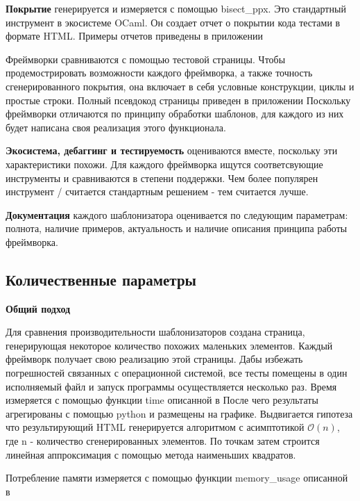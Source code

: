 \textbf{Покрытие} генерируется и измеряется с помощью bisect\_ppx.
Это стандартный инструмент в экосистеме OCaml.
Он создает отчет о покрытии кода тестами в формате HTML.
Примеры отчетов приведены в приложении %

Фреймворки сравниваются с помощью тестовой страницы.
Чтобы продемострировать возможности каждого фреймворка, а также точность сгенерированного покрытия, она включает в себя условные конструкции, циклы и простые строки.
Полный псевдокод страницы приведен в приложении %
Поскольку фреймворки отличаются по принципу обработки шаблонов, для каждого из них будет написана своя реализация этого функционала.

\textbf{Экосистема, дебаггинг и тестируемость} оцениваются вместе, поскольку эти характеристики похожи.
Для каждого фреймворка ищутся соответсвующие инструменты и сравниваются в степени поддержки.
Чем более популярен инструмент / считается стандартным решением - тем считается лучше.

\textbf{Документация} каждого шаблонизатора оценивается по следующим параметрам: полнота, наличие примеров, актуальность и наличие описания принципа работы фреймворка.


\subsection{Количественные параметры}

\textbf{Общий подход}

Для сравнения производительности шаблонизаторов создана страница, генерирующая некоторое количество похожих маленьких элементов.
Каждый фреймворк получает свою реализацию этой страницы.
Дабы избежать погрешностей связанных с операционной системой, все тесты помещены в один исполняемый файл и запуск программы осуществляется несколько раз.
Время измеряется с помощью функции time описанной в %
После чего результаты агрегированы с помощью python и размещены на графике.
Выдвигается гипотеза что результирующий HTML генерируется алгоритмом с асимптотикой $\mathcal{O}(n)$, где n - количество сгенерированных элементов.
По точкам затем строится линейная аппроксимация с помощью метода наименьших квадратов.

Потребление памяти измеряется с помощью функции memory\_usage описанной в %

